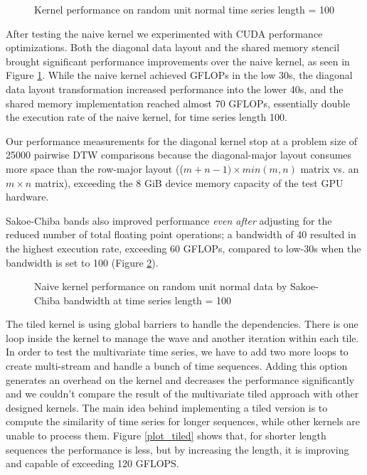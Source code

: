 \documentclass[12pt, letterpaper]{article}
\begin{document}
\begin{figure}[htbp]
    \begin{center}
        \scalebox{0.85}{}
    \end{center}
    \caption{Kernel performance on random unit normal time series length =
      100}
    \label{plot_multi}
\end{figure}

After testing the naive kernel we experimented with CUDA performance
optimizations. Both the diagonal data layout and the shared memory stencil
brought significant performance improvements over the naive kernel, as seen in
Figure \ref{plot_multi}. While the naive kernel achieved GFLOPs in the low 30s,
the diagonal data layout transformation increased performance into the lower
40s, and the shared memory implementation reached almost 70 GFLOPs, essentially
double the execution rate of the naive kernel, for time series length 100.

Our performance measurements for the diagonal kernel stop at a problem size of
25000 pairwise DTW comparisons because the diagonal-major layout consumes more
space than the row-major layout (($m+n-1) \times min(m,n)$ matrix vs. an $m \times n$
matrix), exceeding the 8 GiB device memory capacity of the test GPU hardware.

Sakoe-Chiba bands also improved performance \emph{even after} adjusting for the
reduced number of total floating point operations; a bandwidth of 40 resulted in
the highest execution rate, exceeding 60 GFLOPs, compared to low-30s when the
bandwidth is set to 100 (Figure \ref{plot_bw}).

\begin{figure}[htbp]
    \begin{center}
        \scalebox{0.85}{}
    \end{center}
    \caption{Naive kernel performance on random unit normal data by
      Sakoe-Chiba bandwidth at time series length = 100}
    \label{plot_bw}
\end{figure}

The tiled kernel is using global barriers to handle the dependencies.  There is
one loop inside the kernel to manage the wave and another iteration within each
tile. In order to test the multivariate time series, we have to add two more
loops to create multi-stream and handle a bunch of time sequences. Adding this
option generates an overhead on the kernel and decreases the performance
significantly and we couldn't compare the result of the multivariate tiled
approach with other designed kernels. The main idea behind implementing a tiled
version is to compute the similarity of time series for longer sequences, while
other kernels are unable to process them. Figure \ref{plot_tiled} shows that,
for shorter length sequences the performance is less, but by increasing the
length, it is improving and capable of exceeding 120 GFLOPS.
\end{document}
